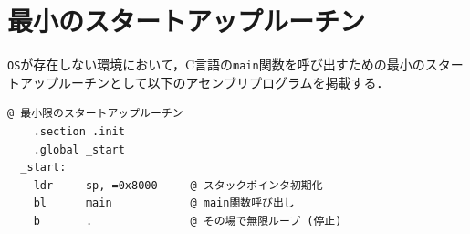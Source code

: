 \documentclass{jlreq}
\begin{document}
  \section{最小のスタートアップルーチン}
  \texttt{OS}が存在しない環境において，C言語の\texttt{main}関数を呼び出すための最小のスタートアップルーチンとして以下のアセンブリプログラムを掲載する．
  \begin{lstlisting}[caption=最小のスタートアップルーチン]
    @ 最小限のスタートアップルーチン
    .section .init
    .global _start
  _start:
    ldr     sp, =0x8000     @ スタックポインタ初期化
    bl      main            @ main関数呼び出し
    b       .               @ その場で無限ループ (停止)
  \end{lstlisting}
\end{document}
